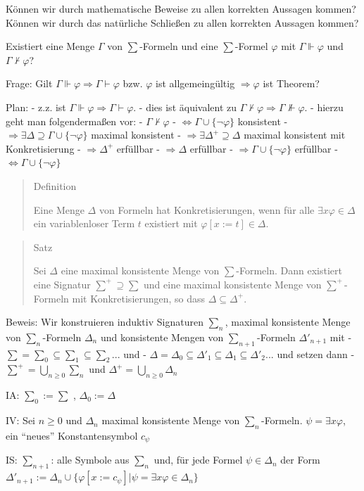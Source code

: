 \documentclass[a4paper]{article}
\begin{document}
\begin{multicols}{3}
  Können wir durch mathematische Beweise zu allen korrekten Aussagen
  kommen? Können wir durch das natürliche Schließen zu allen korrekten
  Aussagen kommen?

  Existiert eine Menge $\Gamma$ von $\sum$-Formeln und eine $\sum$-Formel
  $\varphi$ mit $\Gamma\Vdash\varphi$ und $\Gamma\not\vdash\varphi$?

  Frage: Gilt $\Gamma\Vdash\varphi \Rightarrow \Gamma\vdash\varphi$ bzw.
  $\varphi$ ist allgemeingültig $\Rightarrow\varphi$ ist Theorem?

  Plan: - z.z. ist $\Gamma\Vdash\varphi \Rightarrow \Gamma\vdash\varphi$.
  - dies ist äquivalent zu
  $\Gamma\not\vdash\varphi \Rightarrow \Gamma\not\Vdash\varphi$. - hierzu
  geht man folgendermaßen vor: - $\Gamma\not\vdash\varphi$ -
  $\Leftrightarrow \Gamma\cup\{\lnot\varphi\}$ konsistent -
  $\Rightarrow \exists\Delta\supseteq\Gamma\cup\{\lnot\varphi\}$ maximal
  konsistent - $\Rightarrow \exists\Delta^+ \supseteq\Delta$ maximal
  konsistent mit Konkretisierung - $\Rightarrow \Delta^+$ erfüllbar -
  $\Rightarrow \Delta$ erfüllbar -
  $\Rightarrow \Gamma\cup\{\lnot\varphi\}$ erfüllbar -
  $\Leftrightarrow \Gamma\cup\{\lnot\varphi\}$

  \begin{quote}
    Definition

    Eine Menge $\Delta$ von Formeln hat Konkretisierungen, wenn für alle
    $\exists x\varphi\in\Delta$ ein variablenloser Term $t$ existiert mit
    $\varphi[x:=t]\in\Delta$.
  \end{quote}

  \begin{quote}
    Satz

    Sei $\Delta$ eine maximal konsistente Menge von $\sum$-Formeln. Dann
    existiert eine Signatur $\sum^+ \supseteq\sum$ und eine maximal
    konsistente Menge von $\sum^+$-Formeln mit Konkretisierungen, so dass
    $\Delta\subseteq\Delta^+$.
  \end{quote}

  Beweis: Wir konstruieren induktiv Signaturen $\sum_n$, maximal
  konsistente Menge von $\sum_n$-Formeln $\Delta_n$ und konsistente Mengen
  von $\sum_{n+1}$-Formeln $\Delta'_{n+1}$ mit -
  $\sum =\sum_0 \subseteq\sum_1 \subseteq\sum_2...$ und -
  $\Delta = \Delta_0 \subseteq \Delta'_1 \subseteq\Delta_1 \subseteq\Delta'_2...$
  und setzen dann - $\sum^+ =\bigcup_{n\geq 0} \sum_n$ und
  $\Delta^+ = \bigcup_{n\geq 0} \Delta_n$

  \begin{enumerate*}
    \itemsep1pt\parskip0pt
    \item
          IA: $\sum_0 := \sum$ , $\Delta_0:=\Delta$
    \item
          IV: Sei $n\geq 0$ und $\Delta_n$ maximal konsistente Menge von
          $\sum_n$-Formeln. $\psi=\exists x\varphi$, ein ``neues''
          Konstantensymbol $c_{\psi}$
    \item
          IS: $\sum_{n+1}$: alle Symbole aus $\sum_n$ und, für jede Formel
          $\psi\in\Delta_n$ der Form
          $\Delta'_{n+1}:= \Delta_n\cup\{\varphi[x:=c_{\psi}]|\psi=\exists x\varphi\in\Delta_n\}$


\end{enumerate*}
\end{multicols}
\end{document}
